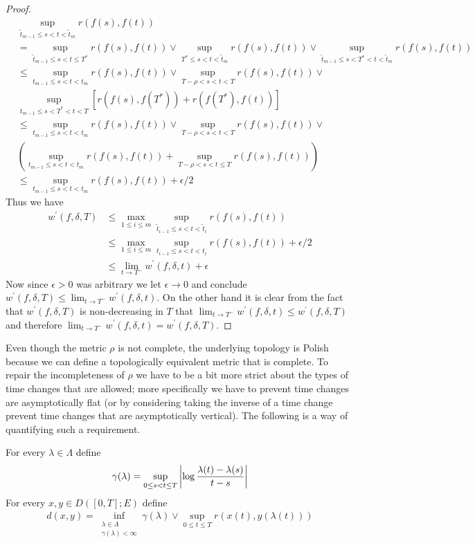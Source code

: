 \begin{proof}
\begin{align*}
&\sup_{\tilde{t}_{m-1} \leq s < t < \tilde{t}_{m}} r(f(s),f(t)) \\
&=\sup_{\tilde{t}_{m-1} \leq s < t \leq T^*} r(f(s),f(t)) \vee \sup_{T^* \leq s < t < \tilde{t}_{m}} r(f(s),f(t)) \vee \sup_{\tilde{t}_{m-1} \leq s < T^* < t < \tilde{t}_{m}} r(f(s),f(t)) \\
&\leq \sup_{t_{m-1} \leq s < t <  t_{m}} r(f(s),f(t)) \vee \sup_{T - \rho < s < t < T} r(f(s),f(t)) \vee \\
&\sup_{t_{m-1} \leq s < T^* < t < T} \left[ r(f(s),f(T^*)) + r(f(T^*), f(t)) \right] \\
&\leq \sup_{t_{m-1} \leq s < t < t_{m}} r(f(s),f(t)) \vee \sup_{T - \rho < s < t < T} r(f(s),f(t)) \vee \\
&\left(\sup_{t_{m-1} \leq s < t < t_{m}} r(f(s),f(t)) + \sup_{T - \rho < s < t \leq T} r(f(s),f(t)) \right) \\
&\leq \sup_{t_{m-1} \leq s < t < t_{m}} r(f(s),f(t)) + \epsilon/2
\end{align*}
Thus we have 
\begin{align*}
w^\prime(f,\delta, T) &\leq \max_{1 \leq i \leq m} \sup_{\tilde{t}_{i-1} \leq s < t < \tilde{t}_i} r(f(s),f(t))  \\
&\leq \max_{1 \leq i \leq m} \sup_{t_{i-1} \leq s < t < t_i} r(f(s),f(t)) + \epsilon/2 \\
&\leq \lim_{t \to T^-} w^\prime(f,\delta, t) + \epsilon
\end{align*}
Now since $\epsilon > 0$ was arbitrary we let $\epsilon \to 0$ and conclude $w^\prime(f,\delta, T)  \leq \lim_{t \to T^-} w^\prime(f,\delta, t) $.
On the other hand it is clear from the fact that $w^\prime(f,\delta,T)$ is non-decreasing in $T$ that $\lim_{t \to T^-} w^\prime(f,\delta, t)  \leq w^\prime(f,\delta, T)$ and therefore $\lim_{t \to T^-} w^\prime(f,\delta, t)  = w^\prime(f,\delta, T)$.
\end{proof}

 Even though the metric $\rho$ is not complete, the underlying topology
is Polish because we can define a topologically equivalent metric that is
complete.  To repair the incompleteness of $\rho$ we have to be a bit
more strict about the types of time changes that are allowed; more
specifically we have to prevent time changes are asymptotically flat
(or by considering taking the inverse of a time change prevent time
changes that are asymptotically vertical).  The following is a way of
quantifying such a requirement.
\begin{defn}For every $\lambda \in \Lambda$ define 
\begin{align*}
\gamma(\lambda) =
  \sup_{0 \leq s < t \leq T} \left \vert \log \frac{\lambda(t) -
      \lambda(s)}{t-s} \right \vert
\end{align*}
For every $x,y \in D([0,T]; E)$ define 
\begin{align*}
d(x,y) = \inf_{\substack{\lambda \in \Lambda \\ \gamma(\lambda) <
    \infty}} \gamma(\lambda) \vee \sup_{0 \leq t \leq T} r(x(t) ,y(\lambda(t)))
\end{align*}
\end{defn}

